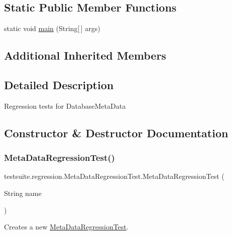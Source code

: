 \subsection*{Static Public Member Functions}
\begin{DoxyCompactItemize}
\item 
static void \mbox{\hyperlink{classtestsuite_1_1regression_1_1_meta_data_regression_test_a2bc970731305062a2b670cd771ed1287}{main}} (String\mbox{[}$\,$\mbox{]} args)
\end{DoxyCompactItemize}
\subsection*{Additional Inherited Members}


\subsection{Detailed Description}
Regression tests for Database\+Meta\+Data 

\subsection{Constructor \& Destructor Documentation}
\mbox{\label{classtestsuite_1_1regression_1_1_meta_data_regression_test_aaba5b0477f0c35256919f9c00a28c461}} 
\subsubsection{\texorpdfstring{Meta\+Data\+Regression\+Test()}{MetaDataRegressionTest()}}
{\footnotesize\ttfamily testsuite.\+regression.\+Meta\+Data\+Regression\+Test.\+Meta\+Data\+Regression\+Test (\begin{DoxyParamCaption}\item[{String}]{name }\end{DoxyParamCaption})}

Creates a new \mbox{\hyperlink{classtestsuite_1_1regression_1_1_meta_data_regression_test}{Meta\+Data\+Regression\+Test}}.


